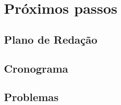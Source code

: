 \section{Próximos passos}
\subsection{Plano de Redação}
\subsection{Cronograma}
\subsection{Problemas}